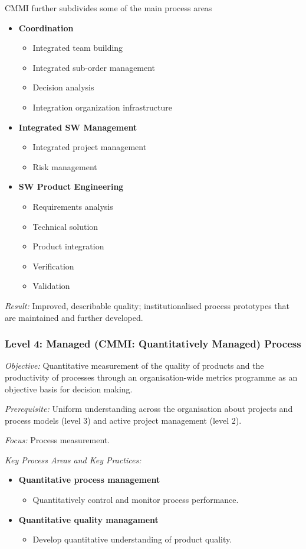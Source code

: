 \documentclass[11pt,a4paper]{article}
\begin{document}
CMMI further subdivides some of the main process areas
\begin {itemize} [noitemsep]
\item \textbf {Coordination}
  \begin {itemize} [noitemsep]
  \item Integrated team building
  \item Integrated sub-order management
  \item Decision analysis
  \item Integration organization infrastructure
  \end {itemize}
\item \textbf {Integrated SW Management}
  \begin {itemize} [noitemsep]
  \item Integrated project management
  \item Risk management
  \end {itemize}
\item \textbf {SW Product Engineering}
  \begin {itemize} [noitemsep]
  \item Requirements analysis
  \item Technical solution
  \item Product integration
  \item Verification
  \item Validation
  \end {itemize}
\end {itemize}

\emph{Result:} Improved, describable quality; institutionalised process
prototypes that are maintained and further developed.

\subsubsection*{Level 4: Managed (CMMI: Quantitatively Managed) Process}

\emph{Objective:} Quantitative measurement of the quality of products and the
productivity of processes through an organisation-wide metrics programme as an
objective basis for decision making.

\emph{Prerequisite:} Uniform understanding across the organisation about
projects and process models (level 3) and active project management (level 2).

\emph{Focus:} Process measurement.

\emph{Key Process Areas and Key Practices:}
\begin{itemize}[noitemsep]
\item \textbf{Quantitative process management}
  \begin{itemize}[noitemsep]
  \item Quantitatively control and monitor process performance.
  \end{itemize}
\item \textbf{Quantitative quality managament}
  \begin{itemize}[noitemsep]
  \item  Develop quantitative understanding of product quality.
  \end{itemize}
\end{itemize}
\end{document}
